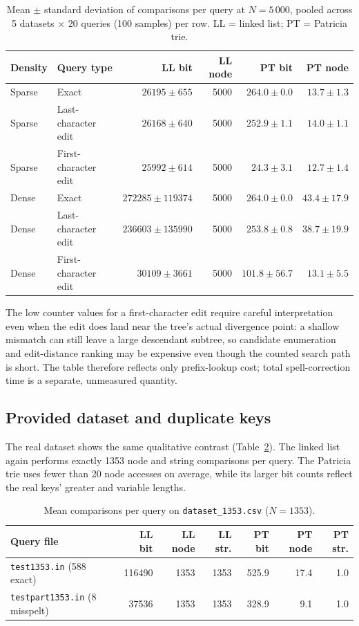 \documentclass[10pt]{article}
\begin{document}
\begin{table}[h]
\centering\small
\begin{tabular}{llrrrr}
\toprule
Density & Query type & LL bit & LL node & PT bit & PT node \\
\midrule
Sparse & Exact                & $26195\pm655$      & 5000 & $264.0\pm0.0$  & $13.7\pm1.3$ \\
Sparse & Last-character edit  & $26168\pm640$      & 5000 & $252.9\pm1.1$  & $14.0\pm1.1$ \\
Sparse & First-character edit & $25992\pm614$      & 5000 & $24.3\pm3.1$   & $12.7\pm1.4$ \\
\midrule
Dense  & Exact                & $272285\pm119374$  & 5000 & $264.0\pm0.0$  & $43.4\pm17.9$ \\
Dense  & Last-character edit  & $236603\pm135990$  & 5000 & $253.8\pm0.8$  & $38.7\pm19.9$ \\
Dense  & First-character edit & $30109\pm3661$     & 5000 & $101.8\pm56.7$ & $13.1\pm5.5$ \\
\bottomrule
\end{tabular}
\caption{Mean $\pm$ standard deviation of comparisons per query at $N=5\,000$, pooled
across 5 datasets $\times$ 20 queries (100 samples) per row. LL = linked list; PT =
Patricia trie.}
\label{tab:qtype}
\end{table}

The low counter values for a first-character edit require careful interpretation even
when the edit does land near the tree's actual divergence point: a shallow mismatch can
still leave a large descendant subtree, so candidate enumeration and edit-distance
ranking may be expensive even though the counted search path is short. The table
therefore reflects only prefix-lookup cost; total spell-correction time is a separate,
unmeasured quantity.

\subsection{Provided dataset and duplicate keys}

The real dataset shows the same qualitative contrast (Table~\ref{tab:real}). The linked
list again performs exactly 1353 node and string comparisons per query. The Patricia trie
uses fewer than 20 node accesses on average, while its larger bit counts reflect the real
keys' greater and variable lengths.

\begin{table}[h]
\centering\small
\begin{tabular}{lrrrrrr}
\toprule
Query file & LL bit & LL node & LL str. & PT bit & PT node & PT str. \\
\midrule
\texttt{test1353.in} (588 exact)      & 116490 & 1353 & 1353 & 525.9 & 17.4 & 1.0 \\
\texttt{testpart1353.in} (8 misspelt) & 37536  & 1353 & 1353 & 328.9 & 9.1  & 1.0 \\
\bottomrule
\end{tabular}
\caption{Mean comparisons per query on \texttt{dataset\_1353.csv} ($N=1353$).}
\label{tab:real}
\end{table}
\end{document}
